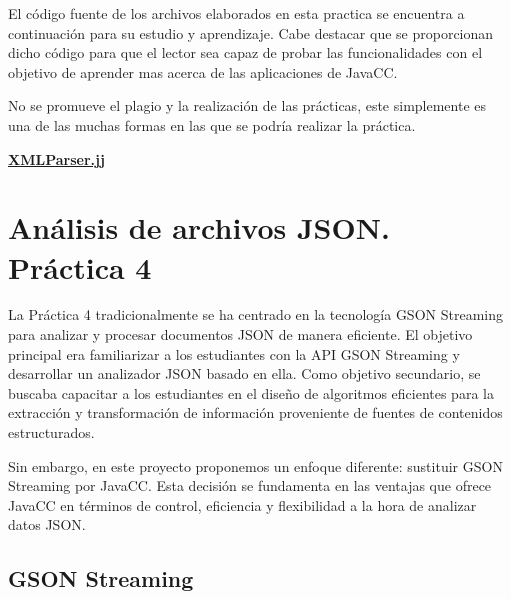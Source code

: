 \noindent El código fuente de los archivos elaborados en esta practica se encuentra a continuación para su estudio y aprendizaje. Cabe destacar que se proporcionan dicho código para que el lector sea capaz de probar las funcionalidades con el objetivo de aprender mas acerca de las aplicaciones de JavaCC.

No se promueve el plagio y la realización de las prácticas, este simplemente es una de las muchas formas en las que se podría realizar la práctica.

\hyperref[sec:XMLParser]{\textbf{XMLParser.jj}}

\section{Análisis de archivos JSON. Práctica 4}


\noindent La Práctica 4 tradicionalmente se ha centrado en la tecnología GSON Streaming para analizar y procesar documentos JSON de manera eficiente. El objetivo principal era familiarizar a los estudiantes con la API GSON Streaming y desarrollar un analizador JSON basado en ella. Como objetivo secundario, se buscaba capacitar a los estudiantes en el diseño de algoritmos eficientes para la extracción y transformación de información proveniente de fuentes de contenidos estructurados.

Sin embargo, en este proyecto proponemos un enfoque diferente: sustituir GSON Streaming por JavaCC. Esta decisión se fundamenta en las ventajas que ofrece JavaCC en términos de control, eficiencia y flexibilidad a la hora de analizar datos JSON.

\subsection{GSON Streaming}


